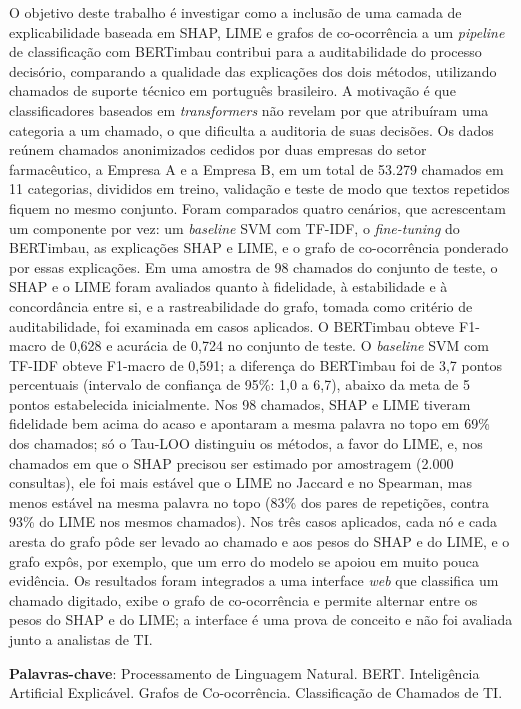 \documentclass[
    12pt,                %
    openright,           %
    oneside,             %
    a4paper,             %
    english,             %
    brazil               %
]{abntex2}
\begin{document}
\begin{resumo}
O objetivo deste trabalho é investigar como a inclusão de uma camada de explicabilidade baseada em SHAP, LIME e grafos de co-ocorrência a um \textit{pipeline} de classificação com BERTimbau contribui para a auditabilidade do processo decisório, comparando a qualidade das explicações dos dois métodos, utilizando chamados de suporte técnico em português brasileiro. A motivação é que classificadores baseados em \textit{transformers} não revelam por que atribuíram uma categoria a um chamado, o que dificulta a auditoria de suas decisões. Os dados reúnem chamados anonimizados cedidos por duas empresas do setor farmacêutico, a Empresa A e a Empresa B, em um total de 53.279 chamados em 11 categorias, divididos em treino, validação e teste de modo que textos repetidos fiquem no mesmo conjunto. Foram comparados quatro cenários, que acrescentam um componente por vez: um \textit{baseline} SVM com TF-IDF, o \textit{fine-tuning} do BERTimbau, as explicações SHAP e LIME, e o grafo de co-ocorrência ponderado por essas explicações. Em uma amostra de 98 chamados do conjunto de teste, o SHAP e o LIME foram avaliados quanto à fidelidade, à estabilidade e à concordância entre si, e a rastreabilidade do grafo, tomada como critério de auditabilidade, foi examinada em casos aplicados. O BERTimbau obteve F1-macro de 0,628 e acurácia de 0,724 no conjunto de teste. O \textit{baseline} SVM com TF-IDF obteve F1-macro de 0,591; a diferença do BERTimbau foi de 3,7 pontos percentuais (intervalo de confiança de 95\%: 1,0 a 6,7), abaixo da meta de 5 pontos estabelecida inicialmente.
Nos 98 chamados, SHAP e LIME tiveram fidelidade bem acima do acaso e apontaram a mesma palavra no topo em 69\% dos chamados; só o Tau-LOO distinguiu os métodos, a favor do LIME, e, nos chamados em que o SHAP precisou ser estimado por amostragem (2.000 consultas), ele foi mais estável que o LIME no Jaccard e no Spearman, mas menos estável na mesma palavra no topo (83\% dos pares de repetições, contra 93\% do LIME nos mesmos chamados).
Nos três casos aplicados, cada nó e cada aresta do grafo pôde ser levado ao chamado e aos pesos do SHAP e do LIME, e o grafo expôs, por exemplo, que um erro do modelo se apoiou em muito pouca evidência.
Os resultados foram integrados a uma interface \textit{web} que classifica um chamado digitado, exibe o grafo de co-ocorrência e permite alternar entre os pesos do SHAP e do LIME; a interface é uma prova de conceito e não foi avaliada junto a analistas de TI.

\vspace{\onelineskip}

\noindent
\textbf{Palavras-chave}: Processamento de Linguagem Natural. BERT. Inteligência Artificial Explicável. Grafos de Co-ocorrência. Classificação de Chamados de TI.
\end{resumo}
\end{document}
